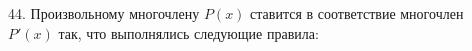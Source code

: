 44. Произвольному многочлену $P(x)$ ставится в соответствие многочлен $P'(x)$ так, что выполнялись следующие правила:\\
